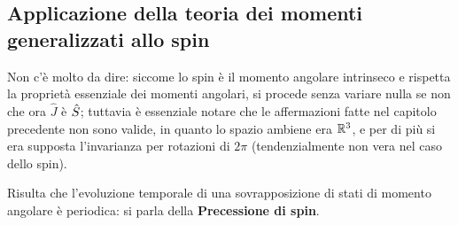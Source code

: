 \subsection{Applicazione della teoria dei momenti generalizzati allo spin}
Non c'è molto da dire: siccome lo spin è il momento angolare intrinseco e rispetta la proprietà essenziale dei momenti angolari, si procede senza variare nulla se non che ora $\hat J$ è $\S$; tuttavia è essenziale notare che le affermazioni fatte nel capitolo precedente non sono valide, in quanto lo spazio ambiene era $\R^3$, e per di più si era supposta l'invarianza per rotazioni di $2\pi$ (tendenzialmente non vera nel caso dello spin).


Risulta che l'evoluzione temporale di una sovrapposizione di stati di momento angolare è periodica: si parla della \textbf{Precessione di spin}.